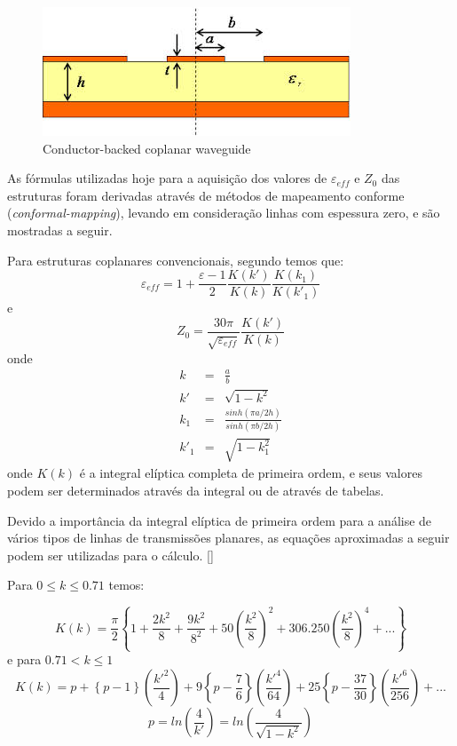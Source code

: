 \begin{figure}[htb!]
	\begin{center}
		\includegraphics[scale=.6]{./cap1/figuras/backed-CPW.jpg}
		\caption{Conductor-backed coplanar waveguide}
		\label{fig:backed-CPW}
	\end{center}
\end{figure}

As fórmulas utilizadas hoje para a aquisição dos valores de $\varepsilon_{eff}$ e $Z_0$ das estruturas foram derivadas através de métodos de mapeamento conforme (\textit{conformal-mapping}), levando em consideração linhas com espessura zero, e são mostradas a seguir.

Para estruturas coplanares convencionais, segundo \citep{Ghione} temos que:
\begin{equation}
\varepsilon_{eff} = 1+ \frac{\varepsilon - 1}{2}\frac{K(k')}{K(k)}\frac{K(k_1)}{K(k'_1)}
\end{equation}
e 
\begin{equation}
Z_0 = \frac{30\pi}{\sqrt{\varepsilon_{eff}}}\frac{K(k')}{K(k)} 
\end{equation}
onde
\begin{eqnarray}
k &=& \frac{a}{b} \\
k' &=& \sqrt{1-k^2}\\
k_1 &=& \frac{sinh(\pi a/2h)}{sinh(\pi b/2h)}\\
k'_1 &=& \sqrt{1 - k^2_1}
\end{eqnarray}
onde $K(k)$ é a integral elíptica completa de primeira ordem, e seus valores podem ser determinados através da integral ou de através de tabelas.

Devido a importância da integral elíptica de primeira ordem para a análise de vários tipos de linhas de transmissões planares, as equações aproximadas a seguir podem ser utilizadas para o cálculo. [\cite{Hoffmann}]

Para $0 \leq k \leq 0.71$ temos:

\begin{equation}
\label{eq:eliptcal1}
\displaystyle
K(k) = \frac{\pi}{2}\left\lbrace 1+ \frac{2k^2}{8} + \frac{9k^2}{8^2} + 50\left(\frac{k^2}{8}\right)^2 + 306.250\left(\frac{k^2}{8}\right)^4 + ...\right\rbrace
\end{equation}
e para $0.71 <  k \leq 1$
\begin{equation}
\label{eq:eliptcal2}
K(k) = p + \left\lbrace p - 1\right\rbrace\left(\frac{k'^2}{4}\right) + 9\left\lbrace p - \frac{7}{6}\right\rbrace \left(\frac{k'^4}{64}\right) + 25\left\lbrace p - \frac{37}{30}\right\rbrace \left(\frac{k'^6}{256} \right)+ ...
\end{equation}
\begin{equation}
\label{eq:eliptcal3}
p = ln(\frac{4}{k'}) = ln(\frac{4}{\sqrt{1-k^2}})
\end{equation}

